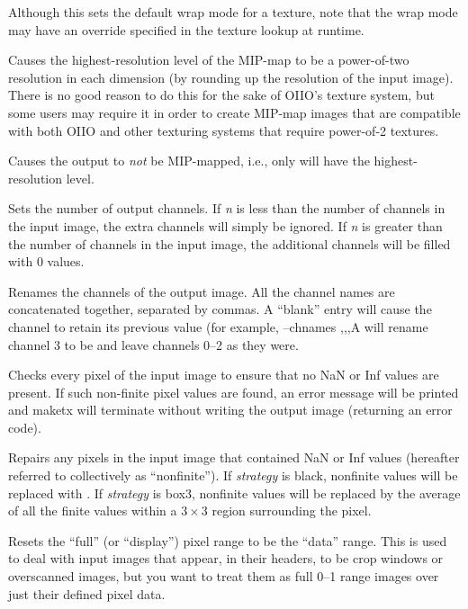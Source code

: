 Although this sets the default wrap mode for a texture, note that
the wrap mode may have an override specified in the texture lookup
at runtime.
\apiend

Causes the highest-resolution level of the MIP-map to be a
power-of-two resolution in each dimension
(by rounding up the resolution of the input image).  There is no
good reason to do this for the sake of OIIO's texture system, but 
some users may require it in order to create MIP-map images
that are compatible with both OIIO and other texturing systems that
require power-of-2 textures.
\apiend

Causes the output to \emph{not} be MIP-mapped, i.e., only will have
the highest-resolution level.
\apiend

Sets the number of output channels.  If \emph{n} is less than the 
number of channels in the input image, the extra channels will simply
be ignored.  If \emph{n} is greater than the number of channels in the
input image, the additional channels will be filled with 0 values.
\apiend

Renames the channels of the output image.  All the channel names are
concatenated together, separated by commas.  A ``blank'' entry will cause
the channel to retain its previous value (for example, {\cf --chnames ,,,A}
will rename channel 3 to be  and leave channels 0--2 as they were.
\apiend

Checks every pixel of the input image to ensure that no NaN or Inf
values are present.  If such non-finite pixel values are found, 
an error message will be printed and {\cf maketx} will terminate without
writing the output image (returning an error code).
\apiend

Repairs any pixels in the input image that contained {\cf NaN} or 
{\cf Inf} values (hereafter referred to collectively as ``nonfinite'').
If \emph{strategy} is {\cf black}, nonfinite values will be replaced
with {}.  If \emph{strategy} is {\cf box3}, nonfinite values will
be replaced by the average of all the finite values within a $3 \times 3$
region surrounding the pixel.
\apiend

\NEW
Resets the ``full'' (or ``display'') pixel range to be the ``data''
range.  This is used to deal with input images that appear, in their
headers, to be crop windows or overscanned images, but you want to treat
them as full 0--1 range images over just their defined pixel data.
\apiend

